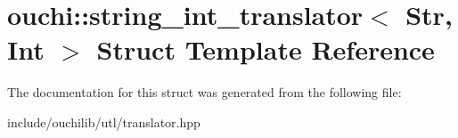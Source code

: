 \hypertarget{structouchi_1_1string__int__translator}{}\section{ouchi\+::string\+\_\+int\+\_\+translator$<$ Str, Int $>$ Struct Template Reference}
\label{structouchi_1_1string__int__translator}


The documentation for this struct was generated from the following file\+:\begin{DoxyCompactItemize}
\item 
include/ouchilib/utl/translator.\+hpp\end{DoxyCompactItemize}
